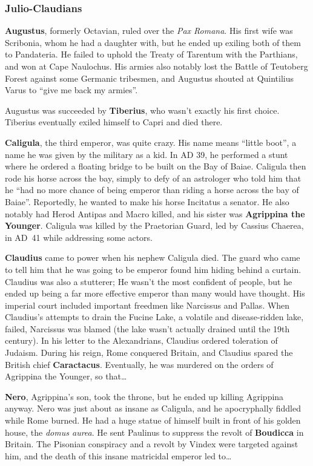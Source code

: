 \subsubsection*{Julio-Claudians}

\textbf{Augustus}, formerly Octavian, ruled over the \textit{Pax Romana}.
His first wife was Scribonia, whom he had a daughter with,
but he ended up exiling both of them to Pandateria.
He failed to uphold the Treaty of Tarentum with the Parthians, and won at Cape Naulochus.
His armies also notably lost the Battle of Teutoberg Forest against some Germanic tribesmen,
and Augustus shouted at Quintilius Varus to ``give me back my armies''.

Augustus was succeeded by \textbf{Tiberius}, who wasn't exactly his first choice.
Tiberius eventually exiled himself to Capri and died there.

\textbf{Caligula}, the third emperor, was quite crazy.
His name means ``little boot'', a name he was given by the military as a kid.
In AD 39, he performed a stunt where he ordered a floating bridge to be built on the Bay of Baiae.
Caligula then rode his horse across the bay, simply to defy of an astrologer who told him that he
``had no more chance of being emperor than riding a horse across the bay of Baiae''.
Reportedly, he wanted to make his horse Incitatus a senator.
He also notably had Herod Antipas and Macro killed,
and his sister was \textbf{Agrippina the Younger}.
Caligula was killed by the Praetorian Guard, led by Cassius Chaerea,
in AD~41 while addressing some actors.

\textbf{Claudius} came to power when his nephew Caligula died.
The guard who came to tell him that he was going to be emperor found him hiding behind a curtain.
Claudius was also a stutterer;
He wasn't the most confident of people,
but he ended up being a far more effective emperor than many would have thought.
His imperial court included important freedmen like Narcissus and Pallas.
When Claudius's attempts to drain the Fucine Lake, a volatile and disease-ridden lake, failed,
Narcissus was blamed (the lake wasn't actually drained until the 19th century).
In his letter to the Alexandrians, Claudius ordered toleration of Judaism.
During his reign, Rome conquered Britain, and Claudius spared the British chief \textbf{Caractacus}.
Eventually, he was murdered on the orders of Agrippina the Younger, so that\ldots{}

\textbf{Nero}, Agrippina's son, took the throne, but he ended up killing Agrippina anyway.
Nero was just about as insane as Caligula, and he apocryphally fiddled while Rome burned.
He had a huge statue of himself built in front of his golden house, the \textit{domus aurea}.
He sent Paulinus to suppress the revolt of \textbf{Boudicca} in Britain.
The Pisonian conspiracy and a revolt by Vindex were targeted against him,
and the death of this insane matricidal emperor led to\ldots{}

